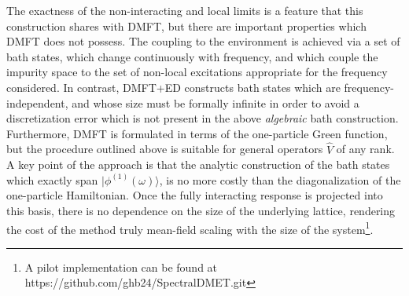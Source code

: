 \documentclass[aps,twocolumn,nobibnotes]{revtex4}
\begin{document}
The exactness of the non-interacting and local limits is a feature that this construction shares with DMFT, but there are important properties which 
DMFT does not possess. The coupling to the environment
is achieved via a set of bath states, which change continuously with frequency, and which couple the impurity space to the set of non-local excitations appropriate for the frequency considered. 
In contrast, DMFT+ED constructs bath states which are
frequency-independent, and whose size must be formally infinite in order to avoid a discretization error which is not present in the above {\em algebraic} bath
construction. Furthermore, DMFT is formulated in terms of the one-particle Green function, but the procedure outlined above is suitable for 
general operators ${\hat V}$ of any rank. 
A key point of the approach is that the analytic construction
of the bath states which exactly span $|\phi^{(1)}(\omega) \rangle$, is no more costly than the diagonalization of the one-particle Hamiltonian. 
Once the fully interacting response is projected into this basis, there is no dependence on the size of the underlying lattice, rendering 
the cost of the method truly mean-field scaling with the size of the system\footnote{A pilot implementation can be found at https://github.com/ghb24/SpectralDMET.git}. 
\end{document}
